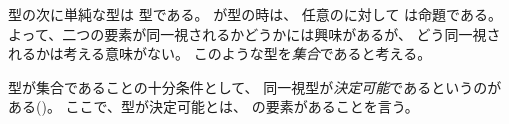 \documentclass[index]{subfiles}
\begin{document}

\myInlineMath{\myTLMinusOne}型の次に単純な型は
\myInlineMath{\myTLZero}型である。
が\myInlineMath{\myTLZero}型の時は、
任意のに対して
は命題である。
よって、二つの要素が同一視されるかどうかには興味があるが、
どう同一視されるかは考える意味がない。
このような型を\emph{集合}であると考える。




型が集合であることの十分条件として、
同一視型が\emph{決定可能}であるというのがある()。
ここで、型が決定可能とは、
の要素があることを言う。



\end{document}

